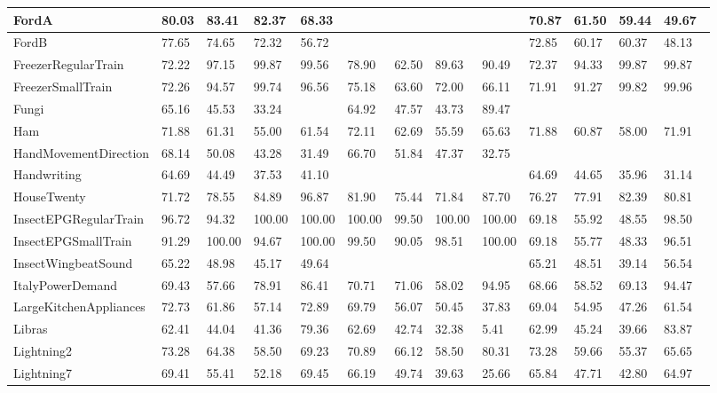 \begin{landscape}
\begin{longtable}{|l|llll|llll|llll|}
      FordA & 80.03 & 83.41 & 82.37 & 68.33 &   &   &   &   & 70.87 & 61.50 & 59.44 & 49.67 \\ \hline
      FordB & 77.65 & 74.65 & 72.32 & 56.72 &   &   &   &   & 72.85 & 60.17 & 60.37 & 48.13 \\ \hline
      FreezerRegularTrain & 72.22 & 97.15 & 99.87 & 99.56 & 78.90 & 62.50 & 89.63 & 90.49 & 72.37 & 94.33 & 99.87 & 99.87 \\ \hline
      FreezerSmallTrain & 72.26 & 94.57 & 99.74 & 96.56 & 75.18 & 63.60 & 72.00 & 66.11 & 71.91 & 91.27 & 99.82 & 99.96 \\ \hline
      Fungi & 65.16 & 45.53 & 33.24 &   & 64.92 & 47.57 & 43.73 & 89.47 &   &   &   &   \\ \hline
      Ham & 71.88 & 61.31 & 55.00 & 61.54 & 72.11 & 62.69 & 55.59 & 65.63 & 71.88 & 60.87 & 58.00 & 71.91 \\ \hline
      HandMovementDirection & 68.14 & 50.08 & 43.28 & 31.49 & 66.70 & 51.84 & 47.37 & 32.75 &   &   &   &   \\ \hline
      Handwriting & 64.69 & 44.49 & 37.53 & 41.10 &   &   &   &   & 64.69 & 44.65 & 35.96 & 31.14 \\ \hline
      HouseTwenty & 71.72 & 78.55 & 84.89 & 96.87 & 81.90 & 75.44 & 71.84 & 87.70 & 76.27 & 77.91 & 82.39 & 80.81 \\ \hline
      InsectEPGRegularTrain & 96.72 & 94.32 & 100.00 & 100.00 & 100.00 & 99.50 & 100.00 & 100.00 & 69.18 & 55.92 & 48.55 & 98.50 \\ \hline
      InsectEPGSmallTrain & 91.29 & 100.00 & 94.67 & 100.00 & 99.50 & 90.05 & 98.51 & 100.00 & 69.18 & 55.77 & 48.33 & 96.51 \\ \hline
      InsectWingbeatSound & 65.22 & 48.98 & 45.17 & 49.64 &   &   &   &   & 65.21 & 48.51 & 39.14 & 56.54 \\ \hline
      ItalyPowerDemand & 69.43 & 57.66 & 78.91 & 86.41 & 70.71 & 71.06 & 58.02 & 94.95 & 68.66 & 58.52 & 69.13 & 94.47 \\ \hline
      LargeKitchenAppliances & 72.73 & 61.86 & 57.14 & 72.89 & 69.79 & 56.07 & 50.45 & 37.83 & 69.04 & 54.95 & 47.26 & 61.54 \\ \hline
      Libras & 62.41 & 44.04 & 41.36 & 79.36 & 62.69 & 42.74 & 32.38 & 5.41 & 62.99 & 45.24 & 39.66 & 83.87 \\ \hline
      Lightning2 & 73.28 & 64.38 & 58.50 & 69.23 & 70.89 & 66.12 & 58.50 & 80.31 & 73.28 & 59.66 & 55.37 & 65.65 \\ \hline
      Lightning7 & 69.41 & 55.41 & 52.18 & 69.45 & 66.19 & 49.74 & 39.63 & 25.66 & 65.84 & 47.71 & 42.80 & 64.97 \\ \hline

\end{longtable}
\end{landscape}
